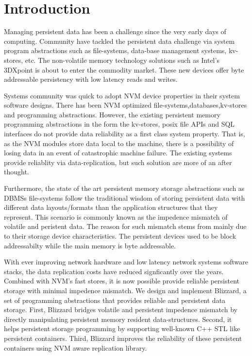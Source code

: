 \section{Introduction}

Managing persistent data has been a challenge since the very early days of computing.
Community have tackled the persistent data challenge via system program abstractions
such as file-systems, data-base management systems, kv-stores, etc.
The non-volatile memory technology solutions such as Intel's 3DXpoint is about to
enter the commodity market. These new devices offer byte addressable persistency
with low latency reads and writes.

Systems community was quick to adopt NVM device properties in their system software
designs. There has been NVM optimized file-systems,databases,kv-stores and programming abstractions.
However, the existing persistent memory programming abstractions in the form the kv-stores, posix 
file APIs and SQL interfaces do not provide data reliability as a first class system
property. That is, as the NVM modules store data local to the machine, there is a possibility of 
losing data in an event of catastrophic machine failure. The existing systems provide reliablity
via data-replication, but such solution are more of an after thought.

Furthermore, the state of the art persistent memory storage abstractions such as DBMSs file-systems
follow the traditional wisdom of storing persistent data with different data layouts/formats
than the application structures that they represent. This scenario is commonly known as 
the impedence mismatch of volatile and peristent data. The reason for such mismatch stems 
from mainly due to their storage device characteristics. The persistent devices used to be
block addressabilty while the main memory is byte addressable.

With ever improving network hardware and low latency network systems software stacks, 
the data replication costs have reduced signficantly over the years. Combined with NVM's
fast stores, it is now possible provide reliable persistent storage with minimal impedence
mismatch. We design and implement Blizzard, a set of programming abstractions that provides 
reliable and persistent data storage. First, Blizzard bridges volatile and persistent impedence
mismatch by directly manipulating persistent memory resident data-structures. Second, it helps
persistent storage programming by supporting well-known C++ STL like persistent containers.
Third, Blizzard improves the reliability of these persistent containers using NVM aware replication library.


